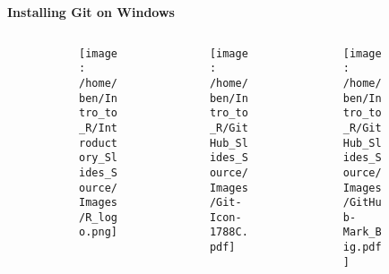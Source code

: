 \documentclass[xcolor=dvipsnames]{beamer}
\begin{document}





\begin{frame} %
\begin{center}
\textbf{\huge Installing Git on Windows}\\
\end{center}

\begin{figure}
\begin{columns}

\begin{column}{3.3cm}
\begin{center}
\begin{figure}
\texttt{[image: /home/ben/Intro\_to\_R/Introductory\_Slides\_Source/Images/R\_logo.png]}
\end{figure}
\end{center}
\end{column} 

\begin{column}{3.3cm}
\begin{center}
\begin{figure}
\texttt{[image: /home/ben/Intro\_to\_R/GitHub\_Slides\_Source/Images/Git-Icon-1788C.pdf]}
\end{figure}
\end{center}
\end{column} 

\begin{column}{3.3cm}
\begin{center}
\begin{figure}
\texttt{[image: /home/ben/Intro\_to\_R/GitHub\_Slides\_Source/Images/GitHub-Mark\_Big.pdf]}
\end{figure}
\end{center}
\end{column} 


\end{columns}
\end{figure}
\end{frame}
\end{document}
